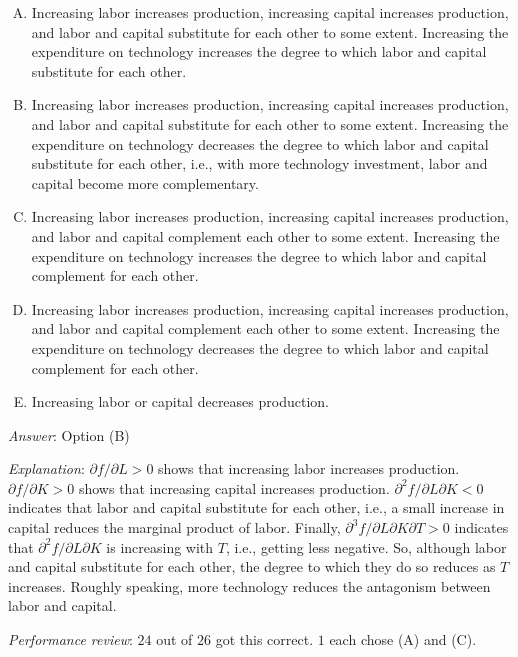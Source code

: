 \documentclass[10pt]{amsart}
\begin{document}
\begin{enumerate}
  \begin{enumerate}[(A)]
  \item Increasing labor increases production, increasing capital
    increases production, and labor and capital substitute for each
    other to some extent. Increasing the expenditure on technology
    increases the degree to which labor and capital substitute for
    each other.
  \item Increasing labor increases production, increasing capital
    increases production, and labor and capital substitute for each
    other to some extent. Increasing the expenditure on technology
    decreases the degree to which labor and capital substitute for
    each other, i.e., with more technology investment, labor and
    capital become more complementary.
  \item Increasing labor increases production, increasing capital
    increases production, and labor and capital complement each other
    to some extent. Increasing the expenditure on technology increases
    the degree to which labor and capital complement for each other.
  \item Increasing labor increases production, increasing capital
    increases production, and labor and capital complement each other
    to some extent. Increasing the expenditure on technology decreases
    the degree to which labor and capital complement for each other.
  \item Increasing labor or capital decreases production.
  \end{enumerate}

  {\em Answer}: Option (B)

  {\em Explanation}: $\partial f/\partial L > 0$ shows that increasing
  labor increases production. $\partial f/\partial K > 0$ shows that
  increasing capital increases production. $\partial^2f/\partial L
  \partial K < 0$ indicates that labor and capital substitute for each
  other, i.e., a small increase in capital reduces the marginal
  product of labor. Finally, $\partial^3f/\partial L\partial K
  \partial T > 0$ indicates that $\partial^2f/\partial L \partial K$
  is increasing with $T$, i.e., getting less negative. So, although
  labor and capital substitute for each other, the degree to which
  they do so reduces as $T$ increases. Roughly speaking, more
  technology reduces the antagonism between labor and capital.

  {\em Performance review}: $24$ out of $26$ got this correct. $1$
  each chose (A) and (C).


\end{enumerate}
\end{document}
